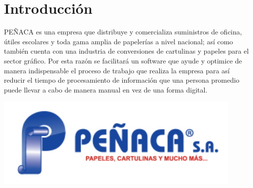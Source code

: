\documentclass[12pt,a4paper]{article}
\begin{document}
\section{Introducción}\textbf{}
PEÑACA es una empresa que distribuye y comercializa suministros de oficina, útiles escolares y toda gama amplia de papelerías a nivel nacional; así como también cuenta con una industria de conversiones de cartulinas y papeles para el sector gráfico.
Por esta razón se facilitará un software que ayude y optimice de manera indispensable el proceso de trabajo que realiza la empresa para así reducir el tiempo de procesamiento de información que una persona promedio puede llevar a cabo de manera manual en vez de una forma digital.
\begin{center}
\includegraphics[width=0.9\textwidth]{Peñaca.png}   
\end{center}

\vspace{8cm}
\end{document}

